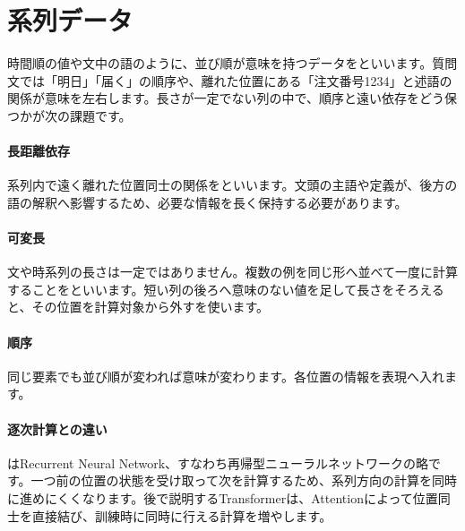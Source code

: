 \par
\endgroup
\par
\endgroup


\section{系列データ}
\label{sec:06-machine-learning-21}

時間順の値や文中の語のように、並び順が意味を持つデータをといいます。質問文では「明日」「届く」の順序や、離れた位置にある「注文番号1234」と述語の関係が意味を左右します。長さが一定でない列の中で、順序と遠い依存をどう保つかが次の課題です。

\begingroup
\begingroup
\paragraph{長距離依存}
        系列内で遠く離れた位置同士の関係をといいます。文頭の主語や定義が、後方の語の解釈へ影響するため、必要な情報を長く保持する必要があります。

\par
\endgroup
\medskip
\begingroup
\paragraph{可変長}
        文や時系列の長さは一定ではありません。複数の例を同じ形へ並べて一度に計算することをといいます。短い列の後ろへ意味のない値を足して長さをそろえると、その位置を計算対象から外すを使います。

\par
\endgroup
\medskip
\begingroup
\paragraph{順序}
        同じ要素でも並び順が変われば意味が変わります。各位置の情報を表現へ入れます。

\par
\endgroup
  \vspace{5mm}
\paragraph{逐次計算との違い}
    はRecurrent Neural Network、すなわち再帰型ニューラルネットワークの略です。一つ前の位置の状態を受け取って次を計算するため、系列方向の計算を同時に進めにくくなります。後で説明するTransformerは、Attentionによって位置同士を直接結び、訓練時に同時に行える計算を増やします。

